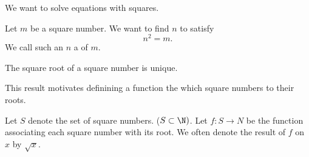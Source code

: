 
\sbasic

















\sstart
{}


We want to solve equations
with squares.


Let $m$ be a square number.
We want to find $n$ to satisfy
\[
  n^2 = m.
\]
We call such an $n$ a
of $m$.

\begin{prop}
The square root of a square
number is unique.
\end{prop}

This result motivates
definining a function
the
which square numbers
to their roots.


Let $S$ denote the set
of square numbers.
($S \subset \N)$.
Let $f: S \to N$ be
the function associating
each square number
with its root.
We often denote
the result of $f$ on $x$
by $\sqrt{x}$.
\strats
